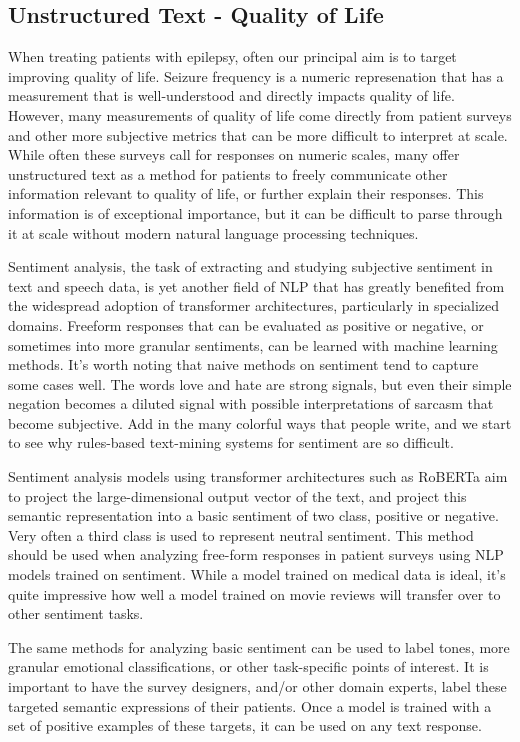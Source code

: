 \subsection{Unstructured Text - Quality of Life}
When treating patients with epilepsy, often our principal aim is to target improving quality of life. Seizure frequency is a numeric represenation that has a measurement
that is well-understood and directly impacts quality of life. However, many measurements of quality of life come directly from patient surveys and other more subjective
metrics that can be more difficult to interpret at scale. While often these surveys call for responses on numeric scales, many offer unstructured text as a method for
patients to freely communicate other information relevant to quality of life, or further explain their responses. This information is of exceptional importance, but it
can be difficult to parse through it at scale without modern natural language processing techniques.

Sentiment analysis, the task of extracting and studying subjective sentiment in text and speech data, is yet another field of NLP that has greatly benefited from the
widespread adoption of transformer architectures, particularly in specialized domains. Freeform responses that can be evaluated as positive or negative, or sometimes into more
granular sentiments, can be learned with machine learning methods. It's worth noting that naive methods on sentiment tend to capture some cases well. The words love and hate are
strong signals, but even their simple negation becomes a diluted signal with possible interpretations of sarcasm that become subjective. Add in the many colorful ways that people
write, and we start to see why rules-based text-mining systems for sentiment are so difficult.

Sentiment analysis models using transformer architectures such as RoBERTa aim to project the large-dimensional output vector of the text, and project this semantic representation
into a basic sentiment of two class, positive or negative. Very often a third class is used to represent neutral sentiment. This method should be used when analyzing free-form responses
in patient surveys using NLP models trained on sentiment. While a model trained on medical data is ideal, it's quite impressive how well a model trained on movie reviews will transfer
over to other sentiment tasks.

The same methods for analyzing basic sentiment can be used to label tones, more granular emotional classifications, or other task-specific points of interest.
It is important to have the survey designers, and/or other domain experts, label these targeted semantic
expressions of their patients. Once a model is trained with a set of positive examples of these targets, it can be used on any text response.

